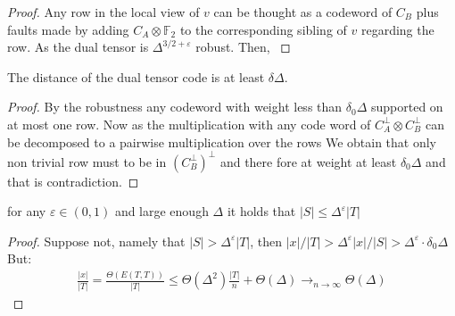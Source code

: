 \begin{proof}
  Any row in the local view of $v$ can be thought as a codeword of $C_{B}$ plus faults made by adding $C_{A}\otimes \mathbb{F}_{2}$ to the corresponding sibling of $v$ regarding the row. As the dual tensor is $\Delta^{3/2+\varepsilon}$ robust. Then, \cite{kalachev2022twosided}       
\end{proof}


\begin{claim}
  The distance of the dual tensor code is at least $\delta\Delta$.
\end{claim}
\begin{proof}
  By the robustness any codeword with weight less than $\delta_{0}\Delta$ supported on at most one row. Now as the multiplication with any code word of $C_{A}^\perp \otimes C_{B}^\perp$ can be decomposed to a pairwise multiplication over the rows We obtain that only non trivial row must to be in $ \left( C_{B}^{\perp} \right)^{\perp}$ and there fore at weight at least $\delta_{0}\Delta$ and that is contradiction.  
\end{proof}

\begin{claim}
  \label{claim:epss}
  for any $\varepsilon \in \left( 0,1 \right)$ and large enough $\Delta$  it holds that $ |S| \le \Delta^{\varepsilon}|T| $ 
\end{claim}
\begin{proof}
  Suppose not, namely that $|S| > \Delta^{\varepsilon}|T|$, then $|x|/|T| > \Delta^{\varepsilon}|x|/|S| > \Delta^{\varepsilon} \cdot \delta_{0}\Delta $ But:  
\begin{equation*}
  \begin{split}
    \frac{|x|}{|T|} = \frac{\Theta \left(E(T,T) \right)}{|T|} \le \Theta(\Delta^{2})\frac{|T|}{n}  + \Theta(\Delta)  \rightarrow_{n\rightarrow \infty} \Theta(\Delta)
  \end{split}
\end{equation*}
\end{proof}

